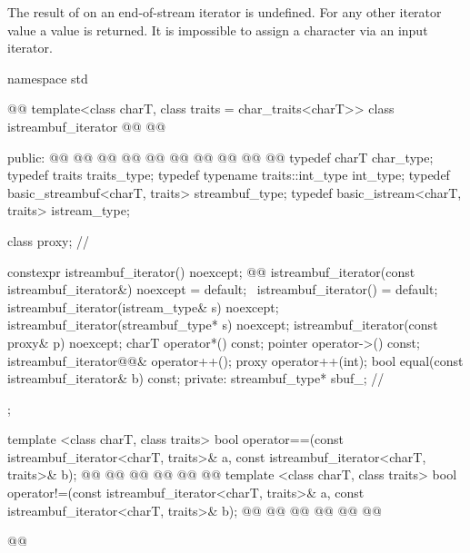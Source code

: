 \pnum
The result of
on an end-of-stream iterator is undefined.
%
For any other iterator value a
value is returned.
It is impossible to assign a character via an input iterator.

%
\begin{codeblock}
namespace std { @@
  template<class charT, class traits = char_traits<charT>>
  class istreambuf_iterator
     @@
                       @@ {
  public:
    @@             @@
    @@                          @@
    @@      @@
    @@                          @@
    @@                   @@
    typedef charT                          char_type;
    typedef traits                         traits_type;
    typedef typename traits::int_type      int_type;
    typedef basic_streambuf<charT, traits> streambuf_type;
    typedef basic_istream<charT, traits>   istream_type;

    class proxy;                           // \expos

    constexpr istreambuf_iterator() noexcept;
    @@
    istreambuf_iterator(const istreambuf_iterator&) noexcept = default;
    ~istreambuf_iterator() = default;
    istreambuf_iterator(istream_type& s) noexcept;
    istreambuf_iterator(streambuf_type* s) noexcept;
    istreambuf_iterator(const proxy& p) noexcept;
    charT operator*() const;
    pointer operator->() const;
    istreambuf_iterator@@& operator++();
    proxy operator++(int);
    bool equal(const istreambuf_iterator& b) const;
  private:
    streambuf_type* sbuf_;                // \expos
  };

  template <class charT, class traits>
    bool operator==(const istreambuf_iterator<charT, traits>& a,
            const istreambuf_iterator<charT, traits>& b);
  @@
    @@
            @@
  @@
    @@
            @@
  template <class charT, class traits>
    bool operator!=(const istreambuf_iterator<charT, traits>& a,
            const istreambuf_iterator<charT, traits>& b);
  @@
    @@
            @@
  @@
    @@
            @@
}@\newtxt{\}\}\}}@
\end{codeblock}

